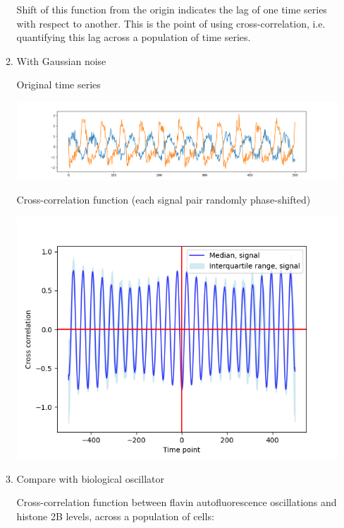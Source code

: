 \begin{enumerate}
\begin{enumerate}
Shift of this function from the origin indicates the lag of one time series with respect to another.  This is the point of using cross-correlation, i.e. quantifying this lag across a population of time series.

\item With Gaussian noise
\label{sec:org8b120ec}

Original time series
\begin{center}
\includegraphics[width=.9\linewidth]{sinusoid_and_fitzhughnagumo.png}
\end{center}

Cross-correlation function (each signal pair randomly phase-shifted)
\begin{center}
\includegraphics[width=.9\linewidth]{randomshift_sinusoid_fitzhughnagumo_noisy_xcf.png}
\end{center}

\item Compare with biological oscillator
\label{sec:orgeeca8c5}

Cross-correlation function between flavin autofluorescence oscillations and histone 2B levels, across a population of cells:


\end{enumerate}
\end{enumerate}
